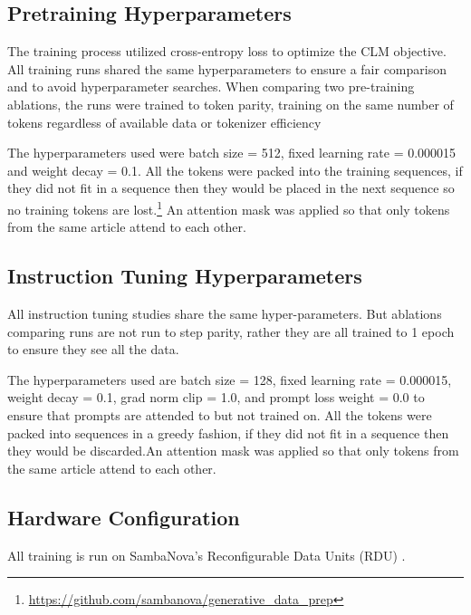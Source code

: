 
\subsection{Pretraining Hyperparameters}\label{pretraining hyperparameters}
The training process utilized cross-entropy loss to optimize the CLM objective. All training runs shared the same hyperparameters to ensure a fair comparison and to avoid hyperparameter searches. When comparing two pre-training ablations, the runs were trained to token parity, training on the same number of tokens regardless of available data or tokenizer efficiency

The hyperparameters used were batch size = 512, fixed learning rate = 0.000015 and weight decay = 0.1. All the tokens were packed into the training sequences, if they did not fit in a sequence then they would be placed in the next sequence so no training tokens are lost.\footnote{\label{note}\href{https://github.com/sambanova/generative_data_prep}{https://github.com/sambanova/generative\_data\_prep}} An attention mask was applied so that only tokens from the same article attend to each other.
 

\subsection{Instruction Tuning Hyperparameters}\label{instruction tuning hyperparameters}
All instruction tuning studies share the same hyper-parameters. But ablations comparing runs are not run to step parity, rather they are all trained to 1 epoch to ensure they see all the data.

The hyperparameters used are batch size = 128, fixed learning rate = 0.000015, weight decay = 0.1, grad norm clip = 1.0, and prompt loss weight = 0.0 to ensure that prompts are attended to but not trained on. All the tokens were packed into sequences in a greedy fashion, if they did not fit in a sequence then they would be discarded.\footnotemark[1] An attention mask was applied so that only tokens from the same article attend to each other.

\subsection{Hardware Configuration}\label{hardware}
All training is run on SambaNova's Reconfigurable Data Units (RDU) \cite{9567250}.
